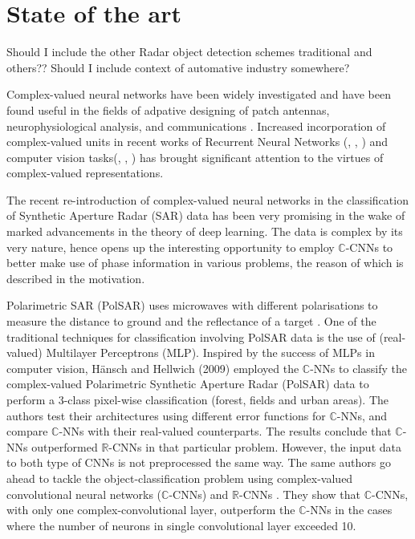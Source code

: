\chapter{State of the art}\label{chap:comp}


Should I include the other Radar object detection schemes traditional and others??
Should I include context of automative industry somewhere? 

Complex-valued neural networks have been widely investigated and have been found useful in the fields of adpative designing of patch antennas, neurophysiological analysis, and communications \cite{hirose2012complex}. Increased incorporation of complex-valued units in recent works of Recurrent Neural Networks (\cite{ArjovskySB15}, \cite{wisdom2016full}, \cite{danihelka2016associative}) and computer vision tasks(\cite{oyallon2015deep}, \cite{bruna2015theoretical}, \cite{worrall2017harmonic}) has brought significant attention to the virtues of complex-valued representations. 


The recent re-introduction of complex-valued neural networks in the classification of Synthetic Aperture Radar (SAR) data has been very promising in the wake of marked advancements in the theory of deep learning. The data is complex by its very nature, hence opens up the interesting opportunity to employ $\mathbb{C}$-CNNs to better make use of phase information in various problems, the reason of which is described in the motivation.

Polarimetric SAR (PolSAR) uses microwaves with different polarisations to measure the distance to ground and the reflectance of a target \cite{hansch2009classification}. One of the traditional techniques for classification involving PolSAR data is the use of (real-valued) Multilayer Perceptrons (MLP). Inspired by the success of MLPs in computer vision, H\"{a}nsch and Hellwich (2009) \cite{hansch2009classification} employed the $\mathbb{C}$-NNs to classify the complex-valued Polarimetric Synthetic Aperture Radar (PolSAR) data to perform a 3-class pixel-wise classification (forest, fields and urban areas). The authors test their architectures using different error functions for $\mathbb{C}$-NNs, and compare $\mathbb{C}$-NNs with their real-valued counterparts. The results conclude that $\mathbb{C}$-NNs outperformed $\mathbb{R}$-CNNs in that particular problem. However, the input data to both type of CNNs is not preprocessed the same way. The same authors go ahead to tackle the object-classification problem using complex-valued convolutional neural networks ($\mathbb{C}$-CNNs) and $\mathbb{R}$-CNNs \cite{hansch2010complex}. They show that $\mathbb{C}$-CNNs, with only one complex-convolutional layer, outperform the $\mathbb{C}$-NNs in the cases where the number of neurons in single convolutional layer exceeded 10. 

